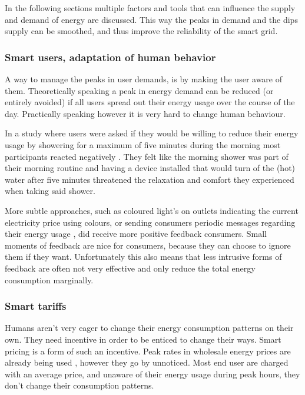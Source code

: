 In the following sections multiple factors and tools that can influence the supply and demand of energy are discussed. This way the peaks in demand and the dips supply can be smoothed, and thus improve the reliability of the smart grid.

\subsubsection{Smart users, adaptation of human behavior}

A way to manage the peaks in user demands, is by making the user aware of them. Theoretically speaking a peak in energy demand can be reduced (or entirely avoided) if all users spread out their energy usage over the course of the day. Practically speaking however it is very hard to change human behaviour.

In a study where users were asked if they would be willing to reduce their energy usage by showering for a maximum of five minutes during the morning most participants reacted negatively \cite{GouldenBedwellRennick-EgglestoneEtAl2014}. They felt like the morning shower was part of their morning routine and having a device installed that would turn of the (hot) water after five minutes threatened the relaxation and comfort they experienced when taking said shower. 

More subtle approaches, such as coloured light's on outlets indicating the current electricity price using colours, or sending consumers periodic messages regarding their energy usage \cite{AyresRasemanShih2012}, did receive more positive feedback consumers. Small moments of feedback are nice for consumers, because they can choose to ignore them if they want. Unfortunately this also means that less intrusive forms of feedback are often not very effective and only reduce the total energy consumption marginally.

\subsubsection{Smart tariffs}

Humans aren’t very eager to change their energy consumption patterns on their own. They need incentive in order to be enticed to change their ways. Smart pricing is a form of such an incentive. Peak rates in wholesale energy prices are already being used \cite{SamadiMohsenian-RadSchoberEtAl2012}, however they go by unnoticed. Most end user are charged with an average price, and unaware of their energy usage during peak hours, they don’t change their consumption patterns. 

